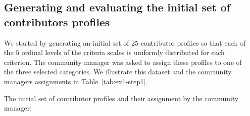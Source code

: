\subsection{Generating and evaluating the initial set of contributors profiles}

We started by generating an initial set of $25$ contributor profiles so that each of the $5$ ordinal levels of the criteria scales is uniformly distributed for each criterion. The community manager was asked to assign these profiles to one of the three selected categories. We illustrate this dataset and the community managers assignments in Table~\ref{tab:ex1-step1}.

\begin{table}
\caption{The initial set of contributor profiles and their assignment by the community manager;}\label{tab:ex1-step1}
\small


\end{table}
